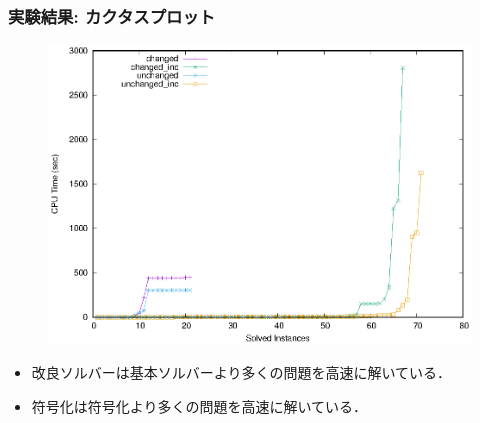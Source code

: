 \documentclass[dvipdfmx,11pt]{beamer}
\begin{document}
\begin{frame}\frametitle{実験結果: カクタスプロット}

  \begin{figure}[h]
    \centering
    \includegraphics[scale=0.6]{fig/cactus.eps}
  \end{figure}

  \begin{itemize}
    \item 改良ソルバーは基本ソルバーより多くの問題を高速に解いている．
    \item {}符号化は符号化より多くの問題を高速に解いている．
  \end{itemize}
  
\end{frame}

\end{document}
